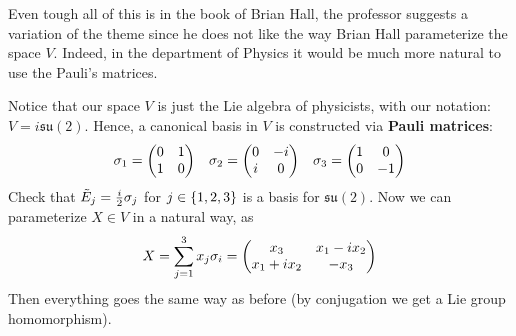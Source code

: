\documentclass[../main.tex]{subfiles}
\begin{document}
Even tough all of this is in the book of Brian Hall, the professor suggests a variation of the theme since he does not like the way Brian Hall parameterize the space $V$. Indeed, in the department of Physics it would be much more natural to use the Pauli's matrices.
\begin{starredExercise} Notice that our space $V$ is just the Lie algebra of physicists, with our notation: $V=i\mathfrak{su}(2)$. Hence, a canonical basis %
in $V$ is constructed via \textbf{Pauli matrices}:
\[
\sigma_1=\mqty(\admat[0]{1,1}) \quad \sigma_2=\mqty(\admat[0]{-i,i}) \quad \sigma_3=\mqty(\dmat[0]{1,-1})
\]
Check that $\Tilde{E}_j=\frac{i}{2}\sigma_j$ for $j\in\Bqty{1,2,3}$ is a basis for $\mathfrak{su}(2)$. Now we can parameterize $X\in V$ in a natural way, as
\[
X=\sum_{j=1}^3 x_j\sigma_i=\mqty(x_3 & x_1-ix_2 \\ x_1+ix_2 & -x_3)
\]
Then everything goes the same way as before (by conjugation we get a Lie group homomorphism).
\end{starredExercise}
\end{document}
